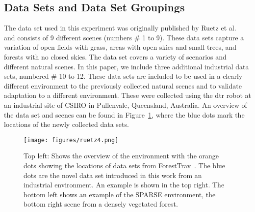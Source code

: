 \subsection{Data Sets and Data Set Groupings}
\label{subsec:data_set_groups}
The data set used in this experiment was originally published by Ruetz et al.~\cite{ruetz2024foresttrav} and consists of 9 different scenes (numbers \# 1 to 9). These data sets capture a variation of open fields with grass, areas with open skies and small trees, and forests with no closed skies. The data set covers a variety of scenarios and different natural scenes. 
In this paper, we include three additional industrial data sets, numbered \# 10 to 12. These data sets are included to be used in a clearly different environment to the previously collected natural scenes and to validate adaptation to a different environment. These were collected using the \ac{dtr} robot at an industrial site of CSIRO in Pullenvale, Queensland, Australia. An overview of the data set and scenes can be found in Figure~\ref{fig:data_set_environments}, where the blue dots mark the locations of the newly collected data sets.

\begin{figure}[ht]
    \centering
    \texttt{[image: figures/ruetz4.png]}
    \caption{Top left: Shows the overview of the environment with the orange dots showing the locations of data sets from ForestTrav~\cite{ruetz2024foresttrav}. The blue dots are the novel data set introduced in this work from an industrial environment. An example is shown in the top right. The bottom left shows an example of the SPARSE environment, the bottom right scene from a densely vegetated forest.}
    \label{fig:data_set_environments}
\end{figure}


